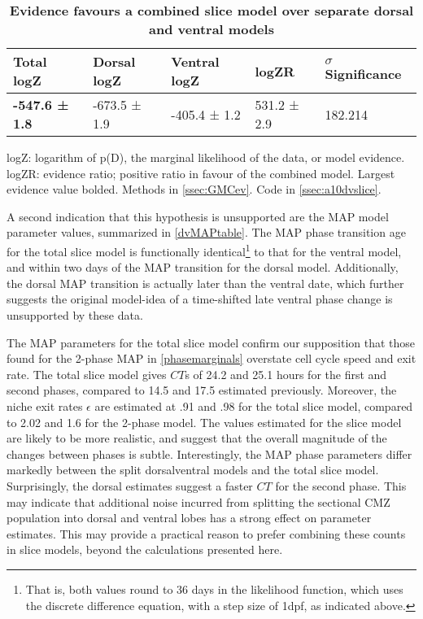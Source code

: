 \begin{table}[!ht]
    \centering
    \caption{{\bf Evidence favours a combined slice model over separate dorsal and ventral models}}
    \begin{tabular}{|l|l|l|l|l|}
        \hline
        {\bf Total logZ} & {\bf Dorsal logZ} & {\bf Ventral logZ} & {\bf logZR} & {\bf $\sigma$ Significance}\\ \hline
        \textbf{-547.6 ± 1.8} & -673.5 ± 1.9 & -405.4 ± 1.2 & 531.2 ± 2.9 & 182.214\\ \hline
        \end{tabular}
    \begin{flushleft} logZ: logarithm of p(D), the marginal likelihood of the data, or model evidence. logZR: evidence ratio; positive ratio in favour of the combined model. Largest evidence value bolded.
    Methods in \autoref{ssec:GMCev}.
    Code in \autoref{ssec:a10dvslice}.     
    \end{flushleft}
    \label{dvtable}
\end{table}

A second indication that this hypothesis is unsupported are the MAP model parameter values, summarized in \autoref{dvMAPtable}. The MAP phase transition age for the total slice model is functionally identical\footnote{That is, both values round to 36 days in the likelihood function, which uses the discrete difference equation, with a step size of 1dpf, as indicated above.} to that for the ventral model, and within two days of the MAP transition for the dorsal model. Additionally, the dorsal MAP transition is actually later than the ventral date, which further suggests the original model-idea of a time-shifted late ventral phase change is unsupported by these data.

The MAP parameters for the total slice model confirm our supposition that those found for the 2-phase MAP in \autoref{phasemarginals} overstate cell cycle speed and exit rate. The total slice model gives $CT$s of 24.2 and 25.1 hours for the first and second phases, compared to 14.5 and 17.5 estimated previously. Moreover, the niche exit rates $\epsilon$ are estimated at .91 and .98 for the total slice model, compared to 2.02 and 1.6 for the 2-phase model. The values estimated for the slice model are likely to be more realistic, and suggest that the overall magnitude of the changes between phases is subtle. Interestingly, the MAP phase parameters differ markedly between the split dorsal\/ventral models and the total slice model. Surprisingly, the dorsal estimates suggest a faster $CT$ for the second phase. This may indicate that additional noise incurred from splitting the sectional CMZ population into dorsal and ventral lobes has a strong effect on parameter estimates. This may provide a practical reason to prefer combining these counts in slice models, beyond the calculations presented here. 

